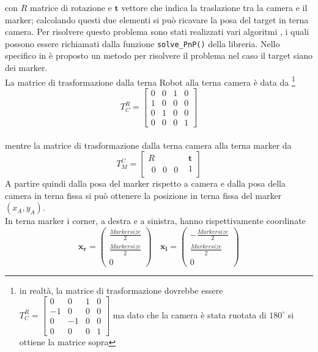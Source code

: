   con $R$ matrice di rotazione e $ \boldsymbol{t}$ vettore che indica la traslazione tra la camera e il marker; calcolando questi due elementi si può ricavare la 
  posa del target in terna camera. Per risolvere questo problema sono stati realizzati vari algoritmi \cite{marchand2015pose}, i quali possono essere richiamati dalla 
  funzione \texttt{solve\_PnP()} della libreria. Nello specifico in \cite{infinitesimal} è proposto un metodo per risolvere il problema nel caso il target siano dei
  marker. \\
  La matrice di trasformazione dalla terna Robot alla terna camera è data da \footnote{in realtà, la matrice di trasformazione dovrebbe essere $T^R_C = \begin{bmatrix} 0 & 0 & 1 & 0 \\ -1 & 0 & 0 & 0 \\ 0 & -1 & 0 & 0 \\ 0 & 0 & 0 & 1 \end{bmatrix} $ ma dato che la camera è stata ruotata di $180^{\circ}$ si ottiene la matrice sopra }   
\begin{equation}
T^R_C = \begin{bmatrix} 0 & 0 & 1 & 0 \\ 1 & 0 & 0 & 0 \\ 0 & 1 & 0 & 0 \\ 0 & 0 & 0 & 1 \end{bmatrix} 
\end{equation}\\ mentre la matrice di trasformazione dalla terna camera alla terna marker da 
\begin{equation}
T^C_M = \begin{bmatrix} R & \boldsymbol{t} \\ \begin{matrix} 0 & 0  & 0 \end{matrix} & 1 \end{bmatrix}
\end{equation}
  A partire quindi dalla posa del marker rispetto a camera e dalla posa della camera in terna fissa si può ottenere la posizione in terna fissa del marker $(x_A, y_A)$.\\
  In terna marker i corner, a destra e a sinistra, hanno rispettivamente coordinate
  \[
     {\boldsymbol{x_r}}=\begin{pmatrix} \frac{Markersize}{2} \\ \frac{Markersize}{2} \\ 0 \end{pmatrix} \ \ \ \;
     {\boldsymbol{x_l}}=\begin{pmatrix} -\frac{Markersize}{2} \\ \frac{Markersize}{2} \\ 0 \end{pmatrix}
  \]
